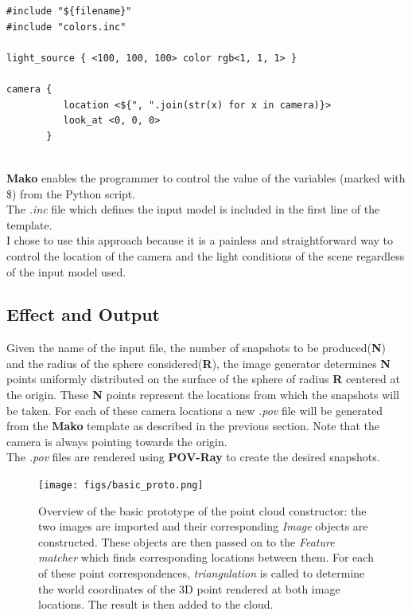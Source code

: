 \documentclass[12pt,a4paper,twoside,openright]{report}
\begin{document}
\begin{verbatim}
#include "${filename}"
#include "colors.inc"

light_source { <100, 100, 100> color rgb<1, 1, 1> }

camera {
          location <${", ".join(str(x) for x in camera)}>
          look_at <0, 0, 0>
       }
\end{verbatim} \\

\textbf{Mako} enables the programmer to control the value of the variables (marked with \$) from the Python script. \\
The \textit{.inc} file which defines the input model is included in the first line of the template. \\
I chose to use this approach because it is a painless and straightforward way to control the location of the camera and the light conditions of the scene regardless of the input model used. 

\subsection{Effect and Output}
Given the name of the input file, the number of snapshots to be produced(\textbf{N}) and the radius of the sphere considered(\textbf{R}), the image generator determines \textbf{N} points uniformly distributed on the surface of the sphere of radius \textbf{R} centered at the origin. These \textbf{N} points represent the locations from which the snapshots will be taken. For each of these camera locations a new \textit{.pov} file will be generated from the \textbf{Mako} template as described in the previous section. Note that the camera is always pointing towards the origin. \\
The \textit{.pov} files are rendered using \textbf{POV-Ray} to create the desired snapshots.


\begin{figure}
\centerline{\texttt{[image: figs/basic\_proto.png]}}
\caption{Overview of the basic prototype of the point cloud constructor: the two images are imported and their corresponding \emph{Image} objects are constructed. These objects are then passed on to the \emph{Feature matcher} which finds corresponding locations between them. For each of these point correspondences, \emph{triangulation} is called to determine the world coordinates of the 3D point rendered at both image locations. The result is then added to the cloud.}
\end{figure}
\end{document}
